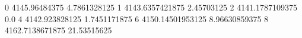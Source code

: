 0 4145.96484375 4.7861328125
1 4143.6357421875 2.45703125
2 4141.1787109375 0.0
4 4142.923828125 1.7451171875
6 4150.14501953125 8.96630859375
8 4162.7138671875 21.53515625
